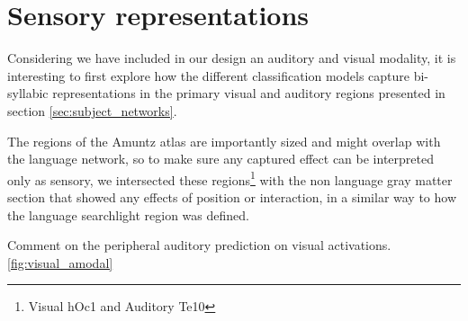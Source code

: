 \section{Sensory representations}

Considering we have included in our design an auditory and visual modality, it is interesting to first explore how the different classification models capture bi-syllabic representations in the primary visual and auditory regions presented in section \ref{sec:subject_networks}.

The regions of the Amuntz atlas are importantly sized and might overlap with the language network, so to make sure any captured effect can be interpreted only as sensory, we intersected these regions\footnote{Visual hOc1 and Auditory Te10} with the non language gray matter section that showed any effects of position or interaction, in a similar way to how the language searchlight region was defined.


Comment on the peripheral auditory prediction on visual activations. \ref{fig:visual_amodal}

